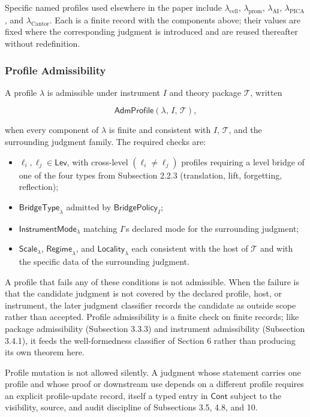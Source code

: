 \documentclass[11pt]{article}
\providecommand{\tightlist}{}
\theoremstyle{definition}
\begin{document}
Specific named profiles used elsewhere in the paper include \(\lambda_{\mathrm{cell}}\), \(\lambda_{\mathrm{prom}}\), \(\lambda_{\mathrm{AI}}\), \(\lambda_{\mathrm{PICA}}\), and \(\lambda_{\mathrm{Cantor}}\). Each is a finite record with the components above; their values are fixed where the corresponding judgment is introduced and are reused thereafter without redefinition.

\subsubsection{Profile Admissibility}

A profile \(\lambda\) is admissible under instrument \(I\) and theory package \(\mathcal T\), written

\[
\mathsf{AdmProfile}(\lambda,\,I,\,\mathcal T),
\]

when every component of \(\lambda\) is finite and consistent with \(I\), \(\mathcal T\), and the surrounding judgment family. The required checks are:

\begin{itemize}
\tightlist
\item
  \(\ell_i,\ell_j\in\mathsf{Lev}\), with cross-level \((\ell_i\neq\ell_j)\) profiles requiring a level bridge of one of the four types from Subsection 2.2.3 (translation, lift, forgetting, reflection);
\item
  \(\mathsf{BridgeType}_\lambda\) admitted by \(\mathsf{BridgePolicy}_I\);
\item
  \(\mathsf{InstrumentMode}_\lambda\) matching \(I\)'s declared mode for the surrounding judgment;
\item
  \(\mathsf{Scale}_\lambda\), \(\mathsf{Regime}_\lambda\), and \(\mathsf{Locality}_\lambda\) each consistent with the host of \(\mathcal T\) and with the specific data of the surrounding judgment.
\end{itemize}

A profile that fails any of these conditions is not admissible. When the failure is that the candidate judgment is not covered by the declared profile, host, or instrument, the later judgment classifier records the candidate as outside scope rather than accepted. Profile admissibility is a finite check on finite records; like package admissibility (Subsection 3.3.3) and instrument admissibility (Subsection 3.4.1), it feeds the well-formedness classifier of Section 6 rather than producing its own theorem here.

Profile mutation is not allowed silently. A judgment whose statement carries one profile and whose proof or downstream use depends on a different profile requires an explicit profile-update record, itself a typed entry in \(\mathsf{Cont}\) subject to the visibility, source, and audit discipline of Subsections 3.5, 4.8, and 10.
\end{document}

